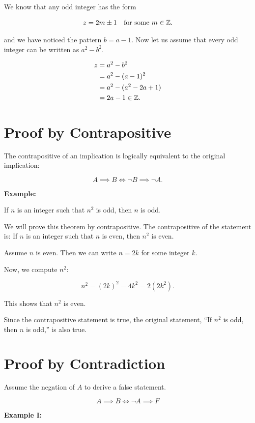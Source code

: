 We know that any odd integer has the form

\[
	z = 2m \pm 1 \quad \text{for some } m \in \mathbb{Z}.
\]

and we have noticed the pattern \(b = a - 1\). Now let us assume that every odd integer can be written as \(a^2 - b^2\).

\begin{align*}
	z & = a^2 - b^2            \\
	  & = a^2 - (a-1)^2        \\
	  & = a^2 - (a^2 - 2a + 1) \\
	  & = 2a - 1 \in \mathbb{Z}.
\end{align*}

\QED

\section{Proof by Contrapositive}

The contrapositive of an implication is logically equivalent to the original implication:

\[
	A \implies B \iff \neg B \implies \neg A.
\]

\textbf{Example:}

If \(n\) is an integer such that \( n^2 \) is odd, then \(n\) is odd.

We will prove this theorem by contrapositive. The contrapositive of the statement is: If \(n\) is an
integer such that \(n\) is even, then \( n^2 \) is even.

Assume \(n\) is even. Then we can write \( n = 2k \) for some integer \(k\).

Now, we compute \( n^2 \):

\[
	n^2 = {(2k)}^2 = 4k^2 = 2(2k^2).
\]

This shows that \( n^2 \) is even.

Since the contrapositive statement is true, the original statement, ``If \( n^2 \) is odd, then \(n\) is
odd,'' is also true.

\QED

\section{Proof by Contradiction}

Assume the negation of \(A\) to derive a false statement.

\[
	A \implies B \iff \neg A \implies F
\]

\textbf{Example I:}

